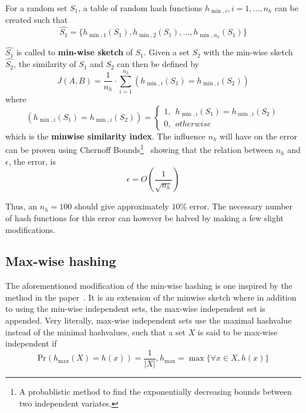 \documentclass[../../main.tex]{subfiles}
\begin{document}
For a random set $S_1$, a table of random hash functions $h_{\min,i},i=1,\ldots,n_h$ can be created such that
$$
\hat{S_1} = \{ h_{\min,1}(S_1),h_{\min,2}(S_1),\ldots,h_{\min,n_h}(S_1)\}
$$

$\hat{S_1}$ is called to \textbf{min-wise sketch} of $S_1$.
Given a set $S_2$ with the min-wise sketch $\hat{S_2}$, the similarity of $S_1$ and $S_2$ can then be defined by
\begin{equation}\label{jacsketch}
J(A,B)=\frac{1}{n_h}\cdot \sum_{i=1}^{n_h} \left(h_{\min,i}(S_1) = h_{\min,i}(S_2)\right)
\end{equation}
where
$$
\left(h_{\min,i}(S_1) = h_{\min,i}(S_2)\right) = \left\{ \begin{array}{ll}
												1, \ \ h_{\min,i}(S_1)=h_{\min,i}(S_2)\\
												0, \ \ otherwise
											  \end{array}\right.
$$
which is the \textbf{minwise similarity index}. The influence $n_h$ will have on the error can be proven using Chernoff Bounds\footnote{A probablistic method to find the exponentially decreasing bounds between two independent variates.}~\cite{errorMinhash} showing that the relation between $n_h$ and $\epsilon$, the error, is 
\begin{equation}\label{minwiseerror}
\epsilon = O\left(\frac{1}{\sqrt{n_h}}\right)
\end{equation}

Thus, an $n_h = 100$ should give approximately $10\%$ error. The necessary number of hash functions for this error can however be halved by making a few slight modifications.

\subsection{Max-wise hashing}

The aforementioned modification of the min-wise hashing is one inspired by the method in the paper~\cite{minmaxhash}. It is an extension of the minwise sketch where in addition to using the min-wise independent sets, the max-wise independent set is appended. Very literally, max-wise independent sets use the maximal hashvalue instead of the minimal hashvalues, such that a set $X$ is said to be max-wise independent if
\begin{equation}\label{maxwise}
\mathrm{Pr}(h_{\max}(X)=h(x))=\frac{1}{|X|}, h_{\max}=\max\{\forall x \in X, h(x)\} 
\end{equation}
\end{document}
